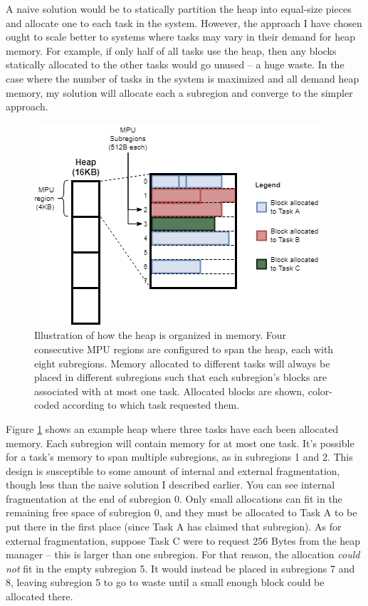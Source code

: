 A naive solution would be to statically partition the heap into equal-size pieces and allocate one to each task in the system. However, the approach I have chosen ought to scale better to systems where tasks may vary in their demand for heap memory. For example, if only half of all tasks use the heap, then any blocks statically allocated to the other tasks would go unused -- a huge waste. In the case where the number of tasks in the system is maximized and all demand heap memory, my solution will allocate each a subregion and converge to the simpler approach.

\begin{figure}[hbtp]
	\centering
	\includegraphics[width=0.7\linewidth]{figs/heap_prot.png}
	\caption{Illustration of how the heap is organized in memory. Four consecutive MPU regions are configured to span the heap, each with eight subregions. Memory allocated to different tasks will always be placed in different subregions such that each subregion's blocks are associated with at most one task. Allocated blocks are shown, color-coded according to which task requested them.}
	\label{fig:heap_prot}
\end{figure}

Figure \ref{fig:heap_prot} shows an example heap where three tasks have each been allocated memory. Each subregion will contain memory for at most one task. It's possible for a task's memory to span multiple subregions, as in subregions 1 and 2. This design is susceptible to some amount of internal and external fragmentation, though less than the naive solution I described earlier. You can see internal fragmentation at the end of subregion 0. Only small allocations can fit in the remaining free space of subregion 0, and they must be allocated to Task A to be put there in the first place (since Task A has claimed that subregion). As for external fragmentation, suppose Task C were to request 256 Bytes from the heap manager -- this is larger than one subregion. For that reason, the allocation \textit{could not} fit in the empty subregion 5. It would instead be placed in subregions 7 and 8, leaving subregion 5 to go to waste until a small enough block could be allocated there.


